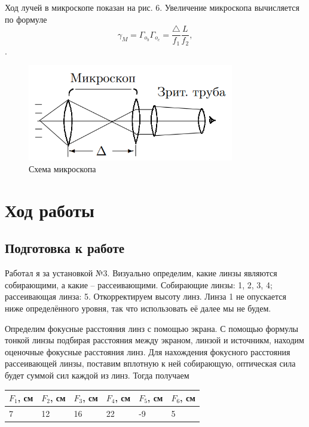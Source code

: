 \documentclass[a4paper,12pt]{article}
\theoremstyle{definition}
\begin{document}
Ход лучей в микроскопе показан на рис. 6. Увеличение микроскопа вычисляется по формуле
    \begin{equation}
        \gamma_M = \Gamma_{o_b} \Gamma_{o_c} = \frac{\triangle}{f_1} \frac{L}{f_2},
    \end{equation}.
    
    \begin{figure}[h]
    \centering
    \includegraphics[width=9cm]{micro_2.PNG}
    \caption{Схема микроскопа}
    \label{fig:vac}
\end{figure}    
    

\newpage
\section{Ход работы}
\subsection{Подготовка к работе}
\par Работал я за установкой №3. Визуально определим, какие линзы являются собирающими, а какие -- рассеивающими. Собирающие линзы: 1, 2, 3, 4; рассеивающая линза: 5. Откорректируем высоту линз. Линза 1 не опускается ниже определённого уровня, так что использовать её далее мы не будем.
\par Определим фокусные расстояния линз с помощью экрана. С помощью формулы тонкой линзы подбирая расстояния между экраном, линзой и источникм, находим оценочные фокусные расстояния линз. Для нахождения фокусного расстояния рассеивающей линзы, поставим вплотную к ней собирающую, оптическая сила будет суммой сил каждой из линз. Тогда получаем

\begin{table}[h!]
\centering
\begin{tabular}{|l|l|l|l|l|l|}
\hline
$F_1$, см & $F_2$, см  & $F_3$, см & $F_4$, см  & $F_5$, см  & $F_6$, см   \\ \hline
7 & 12 & 16 & 22 & -9 & 5 \\ \hline
\end{tabular}
\end{table}
\end{document}
